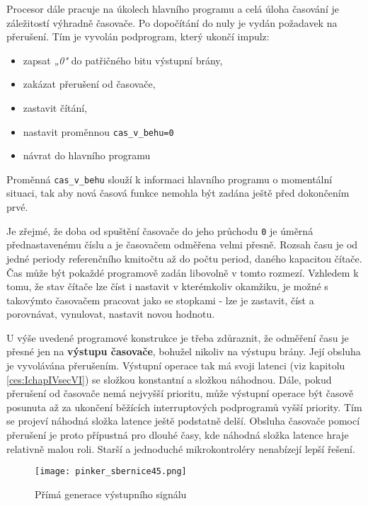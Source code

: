         Procesor dále pracuje na úkolech hlavního programu a celá úloha časování je záležitostí 
        výhradně časovače. Po dopočítání do nuly je vydán požadavek na přerušení. Tím je vyvolán 
        podprogram, který ukončí impulz:
        \begin{itemize}\addtolength{\itemsep}{-0.5\baselineskip}
          \item zapsat \emph{„0"} do patřičného bitu výstupní brány,
          \item zakázat přerušení od časovače,
          \item zastavit čítání,
          \item nastavit proměnnou \texttt{cas\_v\_behu=0}
          \item návrat do hlavního programu
        \end{itemize}
        
        Proměnná \texttt{cas\_v\_behu} slouží k informaci hlavního programu o momentální situaci, 
        tak aby nová časová funkce nemohla být zadána ještě před dokončením prvé.
        
        Je zřejmé, že doba od spuštění časovače do jeho průchodu \texttt{0} je úměrná 
        přednastavenému číslu a je časovačem odměřena velmi přesně. Rozsah času je od jedné periody 
        referenčního kmitočtu až do počtu period, daného kapacitou čítače. Čas může být pokaždé 
        programově zadán libovolně v tomto rozmezí. Vzhledem k tomu, že stav čítače lze číst i 
        nastavit v kterémkoliv okamžiku, je možné s takovýmto časovačem pracovat jako se stopkami - 
        lze je zastavit, číst a porovnávat, vynulovat, nastavit novou hodnotu.
        
        U výše uvedené programové konstrukce je třeba zdůraznit, že odměření času je přesné jen na 
        \textbf{výstupu časovače}, bohužel nikoliv na výstupu brány. Její obsluha je vyvolávána 
        přerušením. Výstupní operace tak má svoji latenci (viz kapitolu \ref{ces:IchapIVsecVI}) se 
        složkou konstantní a složkou náhodnou. Dále, pokud přerušení od časovače nemá nejvyšší 
        prioritu, může výstupní operace být časově posunuta až za ukončení běžících interruptových 
        podprogramů vyšší priority. Tím se projeví náhodná složka latence ještě podstatně delší. 
        Obsluha časovače pomocí přerušení je proto přípustná pro dlouhé časy, kde náhodná složka 
        latence hraje relativně malou roli. Starší a jednoduché mikrokontroléry nenabízejí lepší 
        řešení.
        
        \begin{figure}[ht!] %
          \centering
          \texttt{[image: pinker\_sbernice45.png]}
          \caption{Přímá generace výstupního signálu}
          \label{MIT:fig_sbernice45}
        \end{figure}
        
